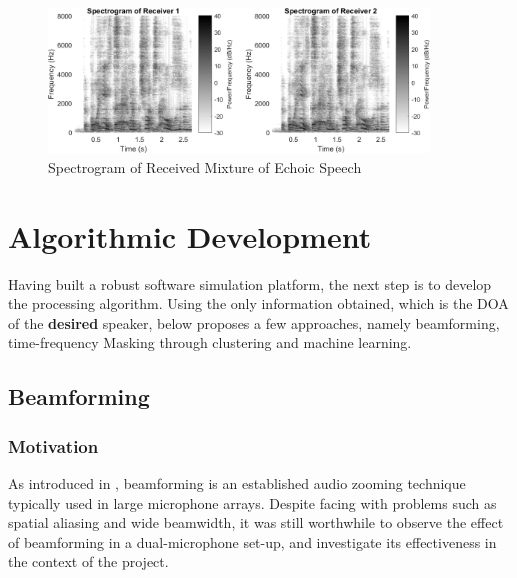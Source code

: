 \documentclass[a4paper,twoside,12pt,hidelinks]{article}
\begin{document}
\begin{figure}[H]
\centering	
\includegraphics[width=0.9\textwidth]{spectrec}
\caption{Spectrogram of Received Mixture of Echoic Speech}
\label{fig:spectrec}
\end{figure}

\newpage
\section{Algorithmic Development}
\label{sect:phaseII}
Having built a robust software simulation platform, the next step is to develop the processing algorithm. Using the only information obtained, which is the DOA of the \textbf{desired} speaker, below proposes a few approaches, namely beamforming, time-frequency Masking through clustering and machine learning. 

\subsection{Beamforming}
\subsubsection{Motivation}
As introduced in , beamforming is an established audio zooming technique typically used in large microphone arrays. Despite facing with problems such as spatial aliasing and wide beamwidth, it was still worthwhile to observe the effect of beamforming in a dual-microphone set-up, and investigate its effectiveness in the context of the project.
\end{document}
